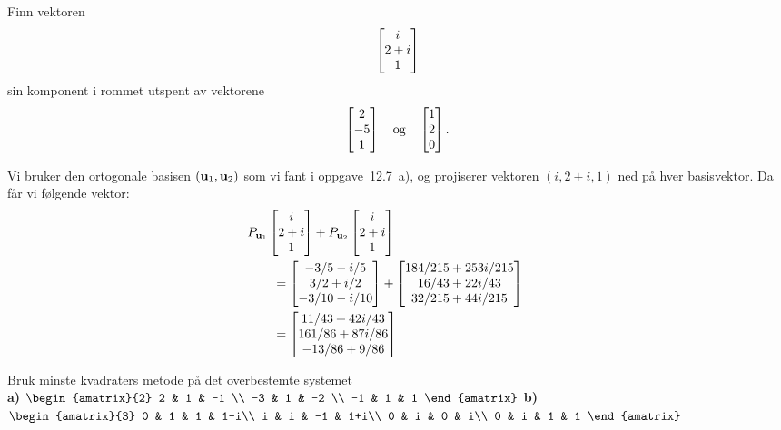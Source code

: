 \begin{oppgave}
Finn vektoren 
\[
\begin{bmatrix} i \\ 2+i \\ 1 \end{bmatrix}
\]
sin komponent i rommet utspent av vektorene 
\[
\begin{bmatrix} 2 \\ -5 \\ 1 \end{bmatrix}\quad  \text{og} \quad \begin{bmatrix} 1 \\ 2 \\ 0 \end{bmatrix}.
\]
\end{oppgave}


\begin{losning}
Vi bruker den ortogonale basisen $(\mathbf{u}_1, \mathbf{u}_2)$ som vi fant i oppgave~12.7~a),
og projiserer vektoren $(i,2+i,1)$ ned på hver basisvektor.
Da får vi følgende vektor:
\begin{align*}
&\!\!\!\!\!\!\!\!\!\!\!\!
P_{\u_1} \vvv{i}{2+i}{1} +
P_{\u_2} \vvv{i}{2+i}{1}
\\
&= \vvv{-3/5 - i/5}{3/2 + i/2}{-3/10 - i/10} +
   \vvv{184/215 + 253i/215}{16/43 + 22i/43}{32/215 + 44i/215}
\\
&= \vvv{11/43 + 42i/43}{161/86 + 87i/86}{-13/86 + 9/86}
\end{align*}
\end{losning}


\begin{oppgave}
Bruk minste kvadraters metode på det overbestemte systemet \\
\textbf{a)}
$
\begin{amatrix}{2}
2 & 1 & -1 \\
-3 & 1 & -2 \\
 -1 & 1  & 1
\end{amatrix}
$
\hfill\textbf{b)}
$
\begin{amatrix}{3}
0 & 1 & 1  & 1-i\\
i & i & -1 & 1+i\\
 0 & i  & 0 & i\\
  0 & i  & 1 & 1
\end{amatrix}
$
\end{oppgave}


